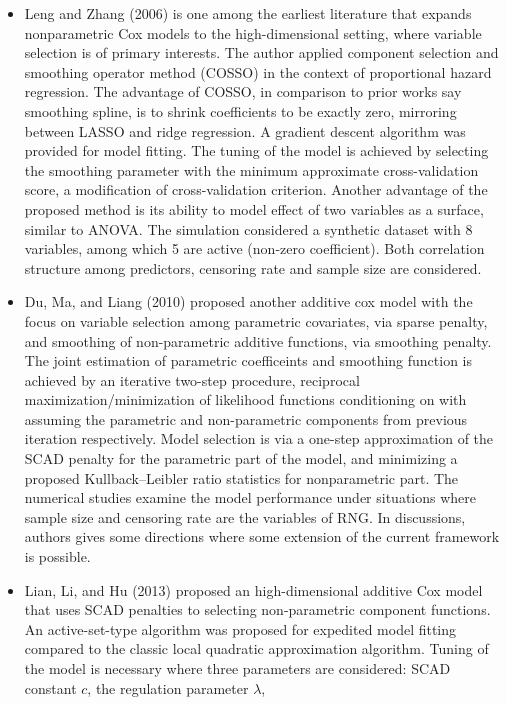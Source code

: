 \documentclass{article}
\begin{document}
\begin{itemize}
\item
  Leng and Zhang (2006) is one among the earliest literature that
  expands nonparametric Cox models to the high-dimensional setting,
  where variable selection is of primary interests. The author applied
  component selection and smoothing operator method (COSSO) in the
  context of proportional hazard regression. The advantage of COSSO, in
  comparison to prior works say smoothing spline, is to shrink
  coefficients to be exactly zero, mirroring between LASSO and ridge
  regression. A gradient descent algorithm was provided for model
  fitting. The tuning of the model is achieved by selecting the
  smoothing parameter with the minimum approximate cross-validation
  score, a modification of cross-validation criterion. Another advantage
  of the proposed method is its ability to model effect of two variables
  as a surface, similar to ANOVA. The simulation considered a synthetic
  dataset with 8 variables, among which 5 are active (non-zero
  coefficient). Both correlation structure among predictors, censoring
  rate and sample size are considered.
\item
  Du, Ma, and Liang (2010) proposed another additive cox model with the
  focus on variable selection among parametric covariates, via sparse
  penalty, and smoothing of non-parametric additive functions, via
  smoothing penalty. The joint estimation of parametric coefficeints and
  smoothing function is achieved by an iterative two-step procedure,
  reciprocal maximization/minimization of likelihood functions
  conditioning on with assuming the parametric and non-parametric
  components from previous iteration respectively. Model selection is
  via a one-step approximation of the SCAD penalty for the parametric
  part of the model, and minimizing a proposed Kullback--Leibler ratio
  statistics for nonparametric part. The numerical studies examine the
  model performance under situations where sample size and censoring
  rate are the variables of RNG. In discussions, authors gives some
  directions where some extension of the current framework is possible.
\item
  Lian, Li, and Hu (2013) proposed an high-dimensional additive Cox
  model that uses SCAD penalties to selecting non-parametric component
  functions. An active-set-type algorithm was proposed for expedited
  model fitting compared to the classic local quadratic approximation
  algorithm. Tuning of the model is necessary where three parameters are
  considered: SCAD constant \(c\), the regulation parameter \(\lambda\),

\end{itemize}
\end{document}
